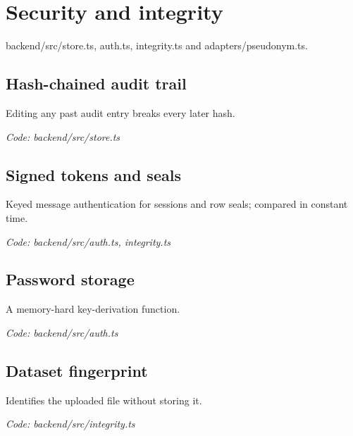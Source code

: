 \documentclass[11pt,a4paper]{article}
\newcommand{\where}[1]{\par{\small\itshape\color{mute}Code: #1}\par}
\begin{document}
\clearpage
\section{Security and integrity}
{\color{mute}backend/src/store.ts, auth.ts, integrity.ts and adapters/pseudonym.ts.}

\subsection*{Hash-chained audit trail}
\par\smallskip\noindent{}\par\smallskip
Editing any past audit entry breaks every later hash.
\where{backend/src/store.ts}

\subsection*{Signed tokens and seals}
\par\smallskip\noindent{}\par\smallskip
Keyed message authentication for sessions and row seals; compared in constant time.
\where{backend/src/auth.ts, integrity.ts}

\subsection*{Password storage}
\par\smallskip\noindent{}\par\smallskip
A memory-hard key-derivation function.
\where{backend/src/auth.ts}

\subsection*{Dataset fingerprint}
\par\smallskip\noindent{}\par\smallskip
Identifies the uploaded file without storing it.
\where{backend/src/integrity.ts}

\clearpage
\end{document}
